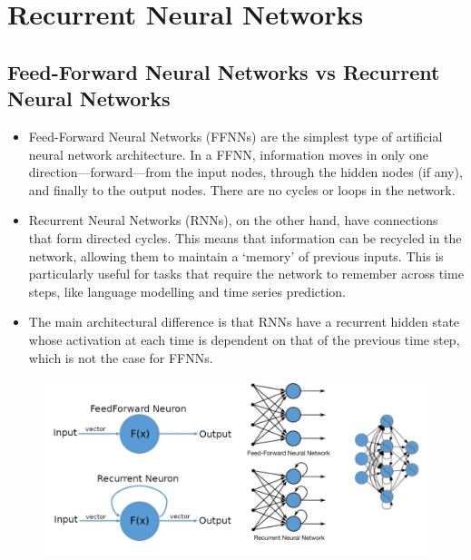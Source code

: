 \chapter{Recurrent Neural Networks}
\section{Feed-Forward Neural Networks vs Recurrent Neural Networks}

\begin{itemize}
    \item Feed-Forward Neural Networks (FFNNs) are the simplest type of artificial neural network architecture. In a FFNN, information moves in only one direction—forward—from the input nodes, through the hidden nodes (if any), and finally to the output nodes. There are no cycles or loops in the network.
    
    \item Recurrent Neural Networks (RNNs), on the other hand, have connections that form directed cycles. This means that information can be recycled in the network, allowing them to maintain a `memory' of previous inputs. This is particularly useful for tasks that require the network to remember across time steps, like language modelling and time series prediction.
    
    \item The main architectural difference is that RNNs have a recurrent hidden state whose activation at each time is dependent on that of the previous time step, which is not the case for FFNNs.
\end{itemize}
\begin{figure}[H]
    \centering
    \includegraphics[width=0.75\linewidth]{img/ffnn_vs_rnn.png}
\end{figure}

